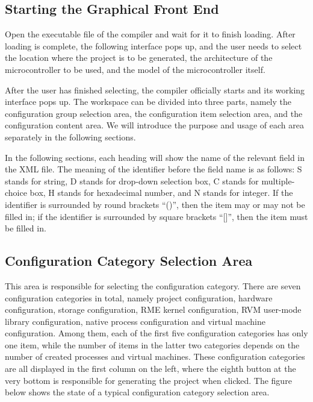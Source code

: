 \subsection{Starting the Graphical Front End}\label{subsec:5-7-1}

Open the executable file of the compiler and wait for it to finish loading. After loading is complete, the following interface pops up, and the user needs to select the location where the project is to be generated, the architecture of the microcontroller to be used, and the model of the microcontroller itself.

After the user has finished selecting, the compiler officially starts and its working interface pops up. The workspace can be divided into three parts, namely the configuration group selection area, the configuration item selection area, and the configuration content area. We will introduce the purpose and usage of each area separately in the following sections.

In the following sections, each heading will show the name of the relevant field in the XML file. The meaning of the identifier before the field name is as follows: S stands for string, D stands for drop-down selection box, C stands for multiple-choice box, H stands for hexadecimal number, and N stands for integer. If the identifier is surrounded by round brackets ``()'', then the item may or may not be filled in; if the identifier is surrounded by square brackets ``{[}{]}'', then the item must be filled in.

\subsection{Configuration Category Selection Area}\label{subsec:5-7-2}

This area is responsible for selecting the configuration category. There are seven configuration categories in total, namely project configuration, hardware configuration, storage configuration, RME kernel configuration, RVM user-mode library configuration, native process configuration and virtual machine configuration. Among them, each of the first five configuration categories has only one item, while the number of items in the latter two categories depends on the number of created processes and virtual machines. These configuration categories are all displayed in the first column on the left, where the eighth button at the very bottom is responsible for generating the project when clicked. The figure below shows the state of a typical configuration category selection area.

